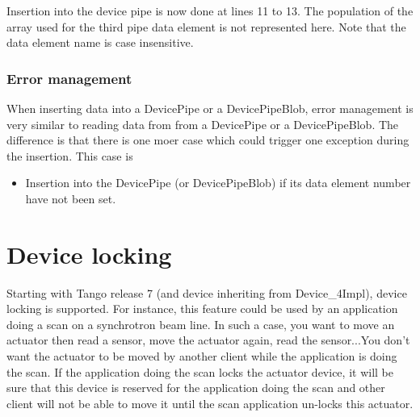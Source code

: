 Insertion into the device pipe is now done at lines 11 to 13. The
population of the array used for the third pipe data element is not
represented here. Note that the data element name is case insensitive.


\subsubsection{Error management}

When inserting data into a DevicePipe or a DevicePipeBlob, error management
is very similar to reading data from from a DevicePipe or a DevicePipeBlob.
The difference is that there is one moer case which could trigger
one exception during the insertion. This case is
\begin{itemize}
\item Insertion into the DevicePipe (or DevicePipeBlob) if its data element
number have not been set.
\end{itemize}

\section{Device locking}

Starting with Tango release 7 (and device inheriting from Device\_4Impl),
device locking is supported. For instance, this feature could be used
by an application doing a scan on a synchrotron beam line. In such
a case, you want to move an actuator then read a sensor, move the
actuator again, read the sensor...You don't want the actuator to be
moved by another client while the application is doing the scan. If
the application doing the scan locks the actuator device, it will
be sure that this device is \textquotedbl{}reserved\textquotedbl{}
for the application doing the scan and other client will not be able
to move it until the scan application un-locks this actuator.

